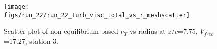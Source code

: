 \begin{figure}[H]
\centering
\texttt{[image: figs/run\_22/run\_22\_turb\_visc\_total\_vs\_r\_meshscatter]}
\caption{Scatter plot of non-equilibrium based $\nu_T$ vs radius at $z/c$=7.75, $V_{free}$=17.27, station 3.}
\label{fig:run_22_turb_visc_total_vs_r_meshscatter}
\end{figure}



